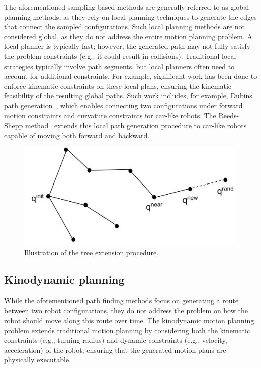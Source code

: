 The aforementioned sampling-based methods are generally referred to as global planning methods, as they rely on local planning techniques to generate the edges that connect the sampled configurations.
Such local planning methods are not considered global, as they do not address the entire motion planning problem. 
A local planner is typically fast; however, the generated path may not fully satisfy the problem constraints (e.g., it could result in collisions).
Traditional local strategies typically involve path segments, but local planners often need to account for additional constraints.
For example, significant work has been done to enforce kinematic constraints on these local plans, ensuring the kinematic feasibility of the resulting global paths.
Such work includes, for example, Dubins path generation~\cite{cDubins}, which enables connecting two configurations under forward motion constraints and curvature constraints for car-like robots. 
The Reeds-Shepp method~\cite{cReeds} extends this local path generation procedure to car-like robots capable of moving both forward and backward.

\begin{figure} [htp]
    \centering
    \includegraphics[width=0.6\linewidth]{figures/models/rrt.png} 
    \caption{Illustration of the  tree extension procedure.}%
    \label{fig:rrt}%
  \end{figure}

\subsection{Kinodynamic planning}

While the aforementioned path finding methods focus on generating a route between two robot configurations, they do not address the problem on how the robot should move along this route over time.
The kinodynamic motion planning problem extends traditional motion planning by considering both the kinematic constraints (e.g., turning radius) and dynamic constraints (e.g., velocity, acceleration) of the robot, ensuring that the generated motion plans are physically executable.

